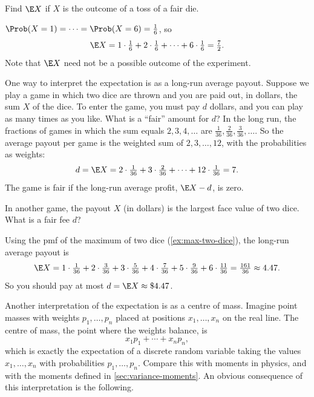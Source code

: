 \begin{example}\label{ex:expectation-fair-die}
Find $\E X$ if $X$ is the outcome of a toss of a fair die.
\end{example}

\begin{solution}
$\Prob(X = 1) = \cdots = \Prob(X = 6) = \tfrac16$, so
\[
  \E X = 1 \cdot \tfrac16 + 2 \cdot \tfrac16 + \cdots + 6 \cdot \tfrac16 = \tfrac72.
\]
Note that $\E X$ need not be a possible outcome of the experiment.
\end{solution}

One way to interpret the expectation is as a long-run average payout. Suppose we play a game in which two dice are thrown and you are paid out, in dollars, the sum $X$ of the dice. To enter the game, you must pay $d$ dollars, and you can play as many times as you like. What is a ``fair'' amount for $d$? In the long run, the fractions of games in which the sum equals $2, 3, 4, \ldots$ are $\tfrac{1}{36}, \tfrac{2}{36}, \tfrac{3}{36}, \ldots$. So the average payout per game is the weighted sum of $2, 3, \ldots, 12$, with the probabilities as weights:
\[
  d = \E X = 2 \cdot \tfrac{1}{36} + 3 \cdot \tfrac{2}{36} + \cdots + 12 \cdot \tfrac{1}{36} = 7.
\]
The game is fair if the long-run average profit, $\E X - d$, is zero.

\begin{example}\label{ex:expected-payout-max}
In another game, the payout $X$ (in dollars) is the largest face value of two dice. What is a fair fee $d$?
\end{example}

\begin{solution}
Using the pmf of the maximum of two dice (\cref{ex:max-two-dice}), the long-run average payout is
\[
  \E X = 1 \cdot \tfrac{1}{36} + 2 \cdot \tfrac{3}{36} + 3 \cdot \tfrac{5}{36} + 4 \cdot \tfrac{7}{36} + 5 \cdot \tfrac{9}{36} + 6 \cdot \tfrac{11}{36} = \tfrac{161}{36} \approx 4.47.
\]
So you should pay at most $d = \E X \approx \$4.47$.
\end{solution}

Another interpretation of the expectation is as a centre of mass. Imagine point masses with weights $p_1, \ldots, p_n$ placed at positions $x_1, \ldots, x_n$ on the real line. The centre of mass, the point where the weights balance, is
\[
  x_1 p_1 + \cdots + x_n p_n,
\]
which is exactly the expectation of a discrete random variable taking the values $x_1, \ldots, x_n$ with probabilities $p_1, \ldots, p_n$. Compare this with moments in physics, and with the moments defined in \cref{sec:variance-moments}. An obvious consequence of this interpretation is the following.

